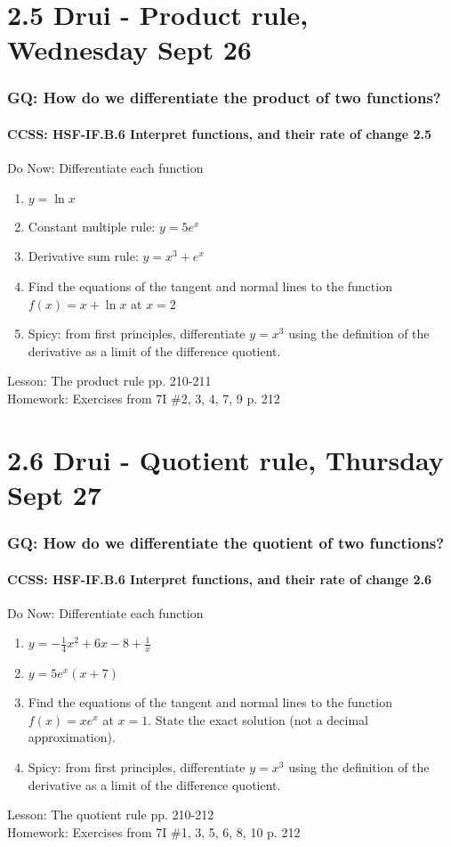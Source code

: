 \documentclass{beamer}
\begin{document}
\section{2.5 Drui - Product rule, Wednesday Sept 26}
  \frame
  {
    \frametitle{GQ: How do we differentiate the product of two functions?}
    \framesubtitle{CCSS: HSF-IF.B.6 Interpret functions, and their rate of change  \alert{2.5}}

    \begin{block}{Do Now: Differentiate each function}
      \begin{enumerate}
      \item $y= \ln x$
      \item Constant multiple rule: $y=5e^x$
      \item Derivative sum rule: $y=x^3+e^x$
      \item Find the equations of the tangent and normal lines to the function $f(x)=x+ \ln x$ at $x=2$
      \item Spicy: from first principles, differentiate $y=x^3$ using the definition of the derivative as a limit of the difference quotient.
      \end{enumerate}
   \end{block}
    Lesson: The product rule pp. 210-211\\ \bigskip
    Homework: Exercises from 7I \#2, 3, 4, 7, 9 p. 212
  }

  \section{2.6 Drui - Quotient rule, Thursday Sept 27}
    \frame
    {
      \frametitle{GQ: How do we differentiate the quotient of two functions?}
      \framesubtitle{CCSS: HSF-IF.B.6 Interpret functions, and their rate of change  \alert{2.6}}

      \begin{block}{Do Now: Differentiate each function}
        \begin{enumerate}
        \item $y= -\frac{1}{4}x^2+6x-8+\frac{1}{x}$
        \item $y=5e^x(x+7)$
        \item Find the equations of the tangent and normal lines to the function $f(x)=x e^x$ at $x=1$. State the exact solution (not a decimal approximation).
        \item Spicy: from first principles, differentiate $y=x^3$ using the definition of the derivative as a limit of the difference quotient.
        \end{enumerate}
     \end{block}
      Lesson: The quotient rule pp. 210-212\\ \bigskip
      Homework: Exercises from 7I \#1, 3, 5, 6, 8, 10 p. 212
    }
\end{document}
